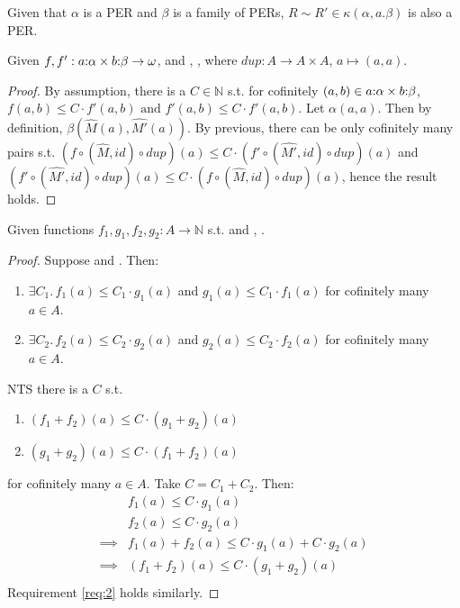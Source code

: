 \begin{corollary} \label{lemma:kappa}
  Given that $\alpha$ is a PER and $\beta$ is a family of PERs,
  $R \sim R' \in \kappa(\alpha, a.\beta)$ is also a PER.
\end{corollary}

\begin{lemma}
  Given $f, f' : a {:} \alpha \times b {:} \beta \to \omega$, 
   and , , 
  where $dup : A \to A \times A$, $a \mapsto (a,a)$.
\end{lemma}

\begin{proof}
  By assumption, there is a $C \in \mathbb{N}$ s.t. for cofinitely $(a,b) \in a {:} \alpha \times b {:} \beta$, 
  $f(a,b) \le C \cdot f'(a,b) \text{ and } f'(a,b) \le C \cdot f'(a,b)$. 
  Let $\alpha(a,a)$. Then by definition, $\beta(\widehat{M}(a), \widehat{M'}(a))$. By previous, there can be only cofinitely many pairs 
  s.t.   $(f \circ (\widehat{M},id) \circ dup)(a) \le C \cdot (f'\circ (\widehat{M'},id) \circ dup) (a)$ and 
  $(f' \circ (\widehat{M'},id) \circ dup)(a) \le C \cdot (f\circ (\widehat{M},id) \circ dup) (a)$, hence the result holds.
\end{proof}

\begin{lemma}\label{lemma:asympsum}
  Given functions $f_1, g_1, f_2, g_2 : A \to \mathbb{N}$ s.t.  and , 
  .
\end{lemma}

\begin{proof}
  Suppose  and . Then:
  \begin{enumerate}
    \item $\exists C_1.\, f_1(a) \le C_1 \cdot g_1(a)$ and $g_1(a) \le C_1 \cdot f_1(a)$ for cofinitely many $a \in A$.
    \item $\exists C_2.\, f_2(a) \le C_2 \cdot g_2(a)$ and $g_2(a) \le C_2 \cdot f_2(a)$ for cofinitely many $a \in A$.
  \end{enumerate}
  NTS there is a $C$ s.t. 
  \begin{enumerate}
    \item $(f_1 + f_2)(a) \le C \cdot (g_1 + g_2)(a)$ 
    \item $(g_1 + g_2)(a) \le C \cdot (f_1 + f_2)(a)$ \label{req:2}
  \end{enumerate}
  for cofinitely many $a \in A$. Take $C = C_1 + C_2$. Then:
  \begin{align*}
    &f_1(a) \le C \cdot g_1(a) \tag{assumption}\\
    &f_2(a) \le C \cdot g_2(a) \tag{assumption}\\
    \implies& f_1(a) + f_2(a) \le C \cdot g_1(a) + C \cdot g_2(a)\\
    \implies& (f_1 + f_2)(a) \le C \cdot (g_1 + g_2)(a)\\
  \end{align*}
  Requirement \ref{req:2} holds similarly.
\end{proof}

